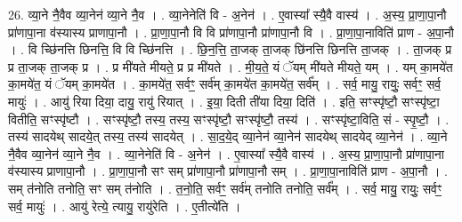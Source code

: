 \documentclass[17pt]{extarticle}
\begin{document}
26. व्या॒ने नै॒वैव व्या॒नेन॑ व्या॒ने नै॒व । . व्या॒नेनेति॑ वि - अ॒नेन॑ । . ए॒वास्या᳚ स्यै॒वै वास्य॑ । . अ॒स्य॒ प्रा॒णा॒पा॒नौ प्रा॑णापा॒ना व॑स्यास्य प्राणापा॒नौ । . प्रा॒णा॒पा॒नौ वि वि प्रा॑णापा॒नौ प्रा॑णापा॒नौ वि । . प्रा॒णा॒पा॒नाविति॑ प्राण - अ॒पा॒नौ । . वि च्छि॑नत्ति छिनत्ति॒ वि वि च्छि॑नत्ति । . छि॒न॒त्ति॒ ता॒जक् ता॒जक् छि॑नत्ति छिनत्ति ता॒जक् । . ता॒जक् प्र प्र ता॒जक् ता॒जक् प्र । . प्र मी॑यते मीयते॒ प्र प्र मी॑यते । . मी॒य॒ते॒ यं ॅयम् मी॑यते मीयते॒ यम् । . यम् का॒मये॑त का॒मये॑त॒ यं ॅयम् का॒मये॑त । . का॒मये॑त॒ सर्वꣳ॒॒ सर्व॑म् का॒मये॑त का॒मये॑त॒ सर्व᳚म् । . सर्व॒ मायु॒ रायुः॒ सर्वꣳ॒॒ सर्व॒ मायुः॑ । . आयु॑ रिया दिया॒ दायु॒ रायु॑ रियात् । . इ॒या॒ दिती ती॑या दिया॒ दिति॑ । . इति॒ सꣳस्पृ॑ष्टौ॒ सꣳस्पृ॑ष्टा॒ वितीति॒ सꣳस्पृ॑ष्टौ । . सꣳस्पृ॑ष्टौ॒ तस्य॒ तस्य॒ सꣳस्पृ॑ष्टौ॒ सꣳस्पृ॑ष्टौ॒ तस्य॑ । . सꣳस्पृ॑ष्टा॒विति॒ सं - स्पृ॒ष्टौ॒ । . तस्य॑ सादयेथ् सादये॒त् तस्य॒ तस्य॑ सादयेत् । . सा॒द॒ये॒द् व्या॒नेन॑ व्या॒नेन॑ सादयेथ् सादयेद् व्या॒नेन॑ । . व्या॒ने नै॒वैव व्या॒नेन॑ व्या॒ने नै॒व । . व्या॒नेनेति॑ वि - अ॒नेन॑ । . ए॒वास्या᳚ स्यै॒वै वास्य॑ । . अ॒स्य॒ प्रा॒णा॒पा॒नौ प्रा॑णापा॒ना व॑स्यास्य प्राणापा॒नौ । . प्रा॒णा॒पा॒नौ सꣳ सम् प्रा॑णापा॒नौ प्रा॑णापा॒नौ सम् । . प्रा॒णा॒पा॒नाविति॑ प्राण - अ॒पा॒नौ । . सम् त॑नोति तनोति॒ सꣳ सम् त॑नोति । . त॒नो॒ति॒ सर्वꣳ॒॒ सर्व॑म् तनोति तनोति॒ सर्व᳚म् । . सर्व॒ मायु॒ रायुः॒ सर्वꣳ॒॒ सर्व॒ मायुः॑ । . आयु॑ रेत्ये॒ त्यायु॒ रायु॑रेति । . ए॒तीत्ये॑ति । \newline
\end{document}
